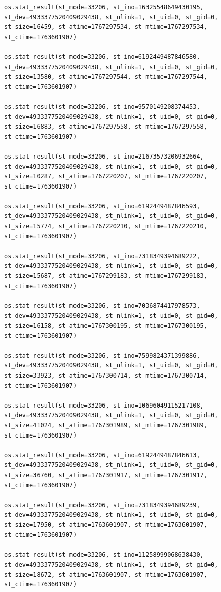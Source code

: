 \documentclass[
  spanish,
  letterpaper,
]{scrbook}
\theoremstyle{definition}
\theoremstyle{remark}
\begin{document}
\begin{verbatim}
os.stat_result(st_mode=33206, st_ino=16325548649430195, st_dev=4933377520409029438, st_nlink=1, st_uid=0, st_gid=0, st_size=16459, st_atime=1767297534, st_mtime=1767297534, st_ctime=1763601907)

os.stat_result(st_mode=33206, st_ino=6192449487846580, st_dev=4933377520409029438, st_nlink=1, st_uid=0, st_gid=0, st_size=13580, st_atime=1767297544, st_mtime=1767297544, st_ctime=1763601907)

os.stat_result(st_mode=33206, st_ino=9570149208374453, st_dev=4933377520409029438, st_nlink=1, st_uid=0, st_gid=0, st_size=16883, st_atime=1767297558, st_mtime=1767297558, st_ctime=1763601907)

os.stat_result(st_mode=33206, st_ino=21673573206932664, st_dev=4933377520409029438, st_nlink=1, st_uid=0, st_gid=0, st_size=10287, st_atime=1767220207, st_mtime=1767220207, st_ctime=1763601907)

os.stat_result(st_mode=33206, st_ino=6192449487846593, st_dev=4933377520409029438, st_nlink=1, st_uid=0, st_gid=0, st_size=15774, st_atime=1767220210, st_mtime=1767220210, st_ctime=1763601907)

os.stat_result(st_mode=33206, st_ino=7318349394689222, st_dev=4933377520409029438, st_nlink=1, st_uid=0, st_gid=0, st_size=15687, st_atime=1767299183, st_mtime=1767299183, st_ctime=1763601907)

os.stat_result(st_mode=33206, st_ino=7036874417978573, st_dev=4933377520409029438, st_nlink=1, st_uid=0, st_gid=0, st_size=16158, st_atime=1767300195, st_mtime=1767300195, st_ctime=1763601907)

os.stat_result(st_mode=33206, st_ino=7599824371399886, st_dev=4933377520409029438, st_nlink=1, st_uid=0, st_gid=0, st_size=33923, st_atime=1767300714, st_mtime=1767300714, st_ctime=1763601907)

os.stat_result(st_mode=33206, st_ino=10696049115217108, st_dev=4933377520409029438, st_nlink=1, st_uid=0, st_gid=0, st_size=41024, st_atime=1767301989, st_mtime=1767301989, st_ctime=1763601907)

os.stat_result(st_mode=33206, st_ino=6192449487846613, st_dev=4933377520409029438, st_nlink=1, st_uid=0, st_gid=0, st_size=36760, st_atime=1767301917, st_mtime=1767301917, st_ctime=1763601907)

os.stat_result(st_mode=33206, st_ino=7318349394689239, st_dev=4933377520409029438, st_nlink=1, st_uid=0, st_gid=0, st_size=17950, st_atime=1763601907, st_mtime=1763601907, st_ctime=1763601907)

os.stat_result(st_mode=33206, st_ino=11258999068638430, st_dev=4933377520409029438, st_nlink=1, st_uid=0, st_gid=0, st_size=18672, st_atime=1763601907, st_mtime=1763601907, st_ctime=1763601907)


\end{verbatim}
\end{document}
